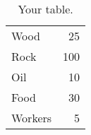 \documentclass{article}
\begin{document}
\begin{table}
\centering
\begin{tabular}{l|r}
Wood & 25 \\
Rock & 100 \\
Oil & 10 \\
Food & 30 \\
Workers & 5 \\
\end{tabular}
\caption{\label{tab:widgets}Your table.}
\end{table}
\end{document}
